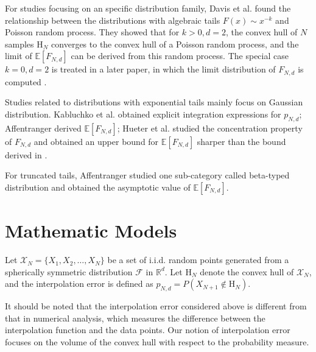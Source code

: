 \documentclass[conference,a4paper]{IEEEtran}
\def\E{\mathbb{E}}
\begin{document}
For studies focusing on an specific distribution family,
Davis et al. \cite{davis1987convex} found the relationship
between the distributions with algebraic tails $F(x) \sim x^{-k}$ and Poisson random process.
They showed that for $k>0, d=2$,
the convex hull of $N$ samples $\mathrm{H}_N$ converges to the convex hull of a Poisson random process,
and
the limit of $\E[F_{N,d}]$ can be derived from this random process.
The special case $k=0, d=2$ is treated in a later paper, in which the
limit distribution of $F_{N,d}$ is computed \cite{aldous1991number}.

Studies related to distributions with exponential tails mainly focus on Gaussian distribution.
Kabluchko et al. \cite{kabluchko2020absorption} obtained explicit integration expressions for $p_{N,d}$;
Affentranger \cite{affentranger1991convex} derived $\E[F_{N,d}]$;
Hueter et al. \cite{hueter1999limit} studied the concentration property of $F_{N,d}$ and obtained
an upper bound for $\E[F_{N,d}]$ sharper than the bound derived in \cite{dwyer1991convex}.

For truncated tails,
Affentranger \cite{affentranger1991convex} studied one sub-category called beta-typed distribution and obtained
the asymptotic value of $\E[F_{N,d}]$.


\section{Mathematic Models}
\label{sec:int_f}

Let $\mathcal{X}_N = \{X_1, X_2, \dots, X_N\}$ be a set of i.i.d. random points generated from
a spherically symmetric distribution $\mathcal{F}$ in $\mathbb{R}^d$.
Let $\mathrm{H}_N$ denote the convex hull of $\mathcal{X}_N$,
and the interpolation error is defined as $p_{N,d}=P(X_{N+1} \not\in \mathrm{H}_N)$.

It should be noted that the interpolation error considered above
is different from that in numerical analysis,
which measures the difference between the interpolation function and the data points.
Our notion of interpolation error focuses on the volume of the convex hull with respect to the probability measure.
\end{document}
